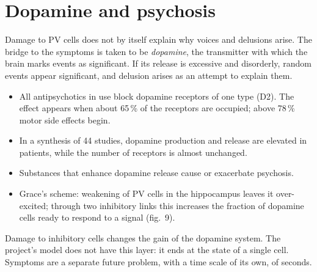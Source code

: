 \section{Dopamine and psychosis}
Damage to PV cells does not by itself explain why voices and delusions arise. The bridge to the symptoms is taken to be \emph{dopamine}, the transmitter with which the brain marks events as significant. If its release is excessive and disorderly, random events appear significant, and delusion arises as an attempt to explain them.
\facts
\begin{itemize}
\item All antipsychotics in use block dopamine receptors of one type (D2). The effect appears when about 65\,\% of the receptors are occupied; above 78\,\% motor side effects begin.\tP
\item In a synthesis of 44 studies, dopamine production and release are elevated in patients, while the number of receptors is almost unchanged.\tP
\item Substances that enhance dopamine release cause or exacerbate psychosis.\tU
\item Grace's scheme: weakening of PV cells in the hippocampus leaves it over-excited; through two inhibitory links this increases the fraction of dopamine cells ready to respond to a signal (fig.~9).\tS
\end{itemize}
\begin{ineq}
Damage to inhibitory cells changes the gain of the dopamine system. The project's model does not have this layer: it ends at the state of a single cell. Symptoms are a separate future problem, with a time scale of its own, of seconds.
\end{ineq}
